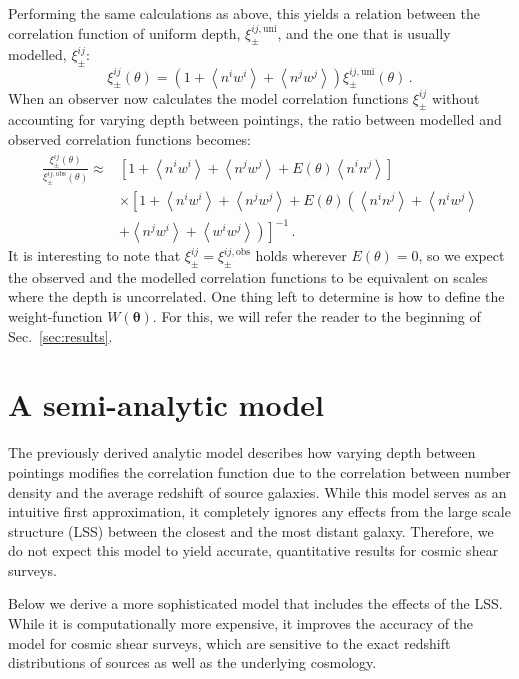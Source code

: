 \documentclass{aa}
\renewcommand{\rm}{\mathrm}
\def\inv{^{-1}}
\def\b#1{\bm{#1}}
\def\la{\left<}
\def\ra{\right>}
\begin{document}
 Performing the same calculations as above, this yields a relation between the correlation function of uniform depth, $\xi_\pm^{ij,\rm{uni}}$, and the one that is usually modelled, $\xi_\pm^{ij}$:
\begin{equation}
\xi_\pm^{ij}(\theta) = \left(1+\la n^iw^i\ra + \la n^jw^j\ra \right)\xi_\pm^{ij,\rm{uni}}(\theta)\, .
\end{equation}
When an observer now calculates the model correlation functions $\xi^{ij}_\pm$ without accounting for varying depth between pointings, the ratio between modelled and observed correlation functions becomes: \begin{align}
\frac{\xi^{ij}_\pm(\theta)}{\xi_\pm^{ij,\rm{obs}}(\theta)} \approx &  \left[1+\la n^iw^i\ra +\la n^jw^j\ra + E(\theta)\la n^in^j\ra\right] \nonumber\\
& \times \left[1 + \la n^iw^i\ra + \la n^jw^j\ra + E(\theta)\left(\la n^in^j\ra + \la n^iw^j\ra \right.\right. \nonumber\\
& \left.\left. + \la n^j w^i\ra + \la w^iw^j\ra\right)\right]\inv
\, .
\label{eq:xipm_analytic}
\end{align}
It is interesting to note that $\xi^{ij}_\pm = \xi_\pm^{ij,\rm{obs}}$ holds wherever $E(\theta)=0$, so we expect the observed and the modelled correlation functions to be equivalent on scales where the depth is uncorrelated. One thing left to determine is how to define the weight-function $W(\b\theta)$. For this, we will refer the reader to the beginning of Sec.~\ref{sec:results}.



\section{A semi-analytic model}
\label{sec:xipm_semianalytic}
The previously derived analytic model describes how varying depth between pointings modifies the correlation function due to the correlation between number density and the average redshift of source galaxies. While this model serves as an intuitive first approximation, it completely ignores any effects from the large scale structure (LSS) between the closest and the most distant galaxy. Therefore, we do not expect this model to yield accurate, quantitative results for cosmic shear surveys.

Below we derive a more sophisticated model that includes the effects of the LSS. While it is computationally more expensive, it improves the accuracy of the model for cosmic shear surveys, which are sensitive to the exact redshift distributions of sources as well as the underlying cosmology.
\end{document}
